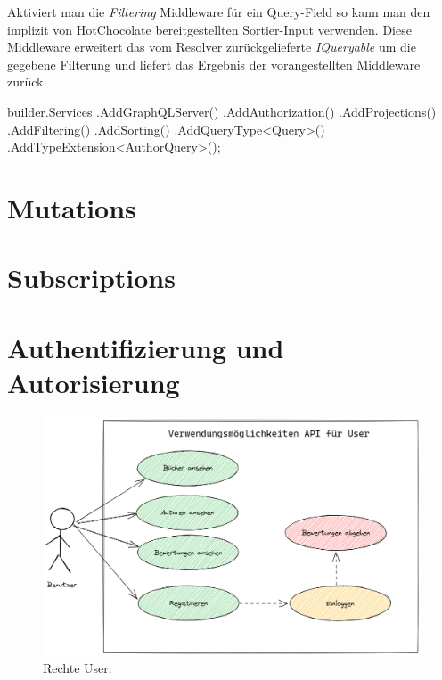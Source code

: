 Aktiviert man die \textit{Filtering} Middleware für ein Query-Field so kann man den implizit von HotChocolate bereitgestellten Sortier-Input verwenden.
Diese Middleware erweitert das vom Resolver zurückgelieferte \textit{IQueryable} um die gegebene Filterung und liefert das Ergebnis der vorangestellten Middleware zurück.





\begin{JsCode}
builder.Services
    .AddGraphQLServer()
    .AddAuthorization()
    .AddProjections()
    .AddFiltering()
    .AddSorting()
    .AddQueryType<Query>()
    .AddTypeExtension<AuthorQuery>();
\end{JsCode}

\section{Mutations}

\section{Subscriptions}

\section{Authentifizierung und Autorisierung}

\begin{figure}[H]
    \includegraphics[width=\textwidth]{pics/UseCaseUser.png}
    \caption{Rechte User.}
\end{figure}

